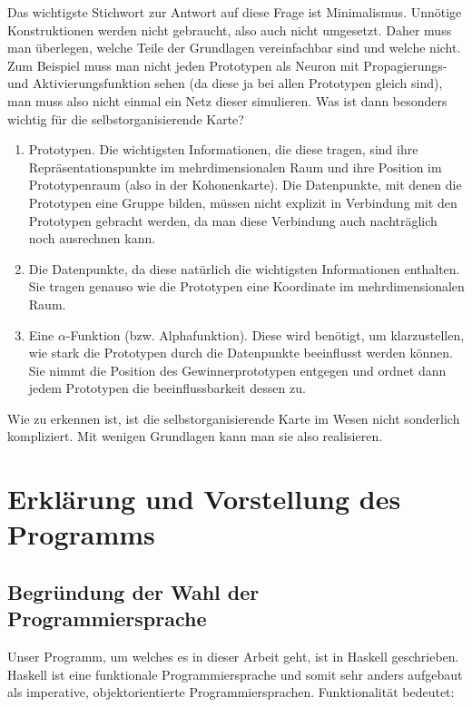 \documentclass[twoside,a4paper,draft]{article}
\begin{document}
Das wichtigste Stichwort zur Antwort auf diese Frage ist Minimalismus. Unnötige Konstruktionen werden nicht gebraucht, also auch nicht umgesetzt. Daher muss man überlegen, welche Teile der Grundlagen vereinfachbar sind und welche nicht. Zum Beispiel muss man nicht jeden Prototypen als Neuron mit Propagierungs- und Aktivierungsfunktion sehen (da diese ja bei allen Prototypen gleich sind), man muss also nicht einmal ein Netz dieser simulieren. Was ist dann besonders wichtig für die selbstorganisierende Karte?

\begin{enumerate}
\item Prototypen. Die wichtigsten Informationen, die diese tragen, sind ihre Repräsentationspunkte im mehrdimensionalen Raum und ihre Position im Prototypenraum (also in der Kohonenkarte). Die Datenpunkte, mit denen die Prototypen eine Gruppe bilden, müssen nicht explizit in Verbindung mit den Prototypen gebracht werden, da man diese Verbindung auch nachträglich noch ausrechnen kann.
\item Die Datenpunkte, da diese natürlich die wichtigsten Informationen enthalten. Sie tragen genauso wie die Prototypen eine Koordinate im mehrdimensionalen Raum.
\item Eine \(\alpha\)-Funktion (bzw. Alphafunktion). Diese wird benötigt, um klarzustellen, wie stark die Prototypen durch die Datenpunkte beeinflusst werden können. Sie nimmt die Position des Gewinnerprototypen entgegen und ordnet dann jedem Prototypen die beeinflussbarkeit dessen zu.
\end{enumerate}

Wie zu erkennen ist, ist die selbstorganisierende Karte im Wesen nicht sonderlich kompliziert. Mit wenigen Grundlagen kann man sie also realisieren.

\section{Erklärung und Vorstellung des Programms}

\subsection{Begründung der Wahl der Programmiersprache}

Unser Programm, um welches es in dieser Arbeit geht, ist in Haskell geschrieben. Haskell ist eine funktionale Programmiersprache und somit sehr anders aufgebaut als imperative, objektorientierte Programmiersprachen. Funktionalität bedeutet:
\end{document}
